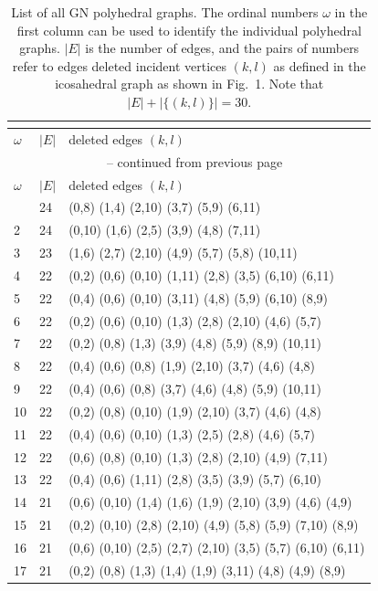 \footnotesize{\begin{longtable}{lll}
    \caption{List of all GN polyhedral graphs. The ordinal numbers $\omega$ in the first column
    can be used to identify the individual polyhedral graphs.
    $|E|$ is the number of edges, and the pairs of numbers refer to edges deleted
    incident vertices $(k,l)$ as defined in the icosahedral graph
    as shown in Fig.~1. Note that $|E|+|\{(k,l)\}|=30.$}\\
    \label{tab:icosubgraphs}\\
%
\toprule
    $\omega$  & $|E|$  &  deleted edges $(k,l)$\\\midrule
\endfirsthead
\multicolumn{3}{c}{\tablename~\thetable{} -- continued from previous page}\\
\toprule
    $\omega$  & $|E|$  &  deleted edges $(k,l)$\\\midrule
\endhead
\bottomrule\endfoot
1   & 24 & (0,8) (1,4) (2,10) (3,7) (5,9) (6,11) \\
2   & 24 & (0,10) (1,6) (2,5) (3,9) (4,8) (7,11) \\
3   & 23 & (1,6) (2,7) (2,10) (4,9) (5,7) (5,8) (10,11) \\
4   & 22 & (0,2) (0,6) (0,10) (1,11) (2,8) (3,5) (6,10) (6,11) \\
5   & 22 & (0,4) (0,6) (0,10) (3,11) (4,8) (5,9) (6,10) (8,9) \\
6   & 22 & (0,2) (0,6) (0,10) (1,3) (2,8) (2,10) (4,6) (5,7) \\
7   & 22 & (0,2) (0,8) (1,3) (3,9) (4,8) (5,9) (8,9) (10,11) \\
8   & 22 & (0,4) (0,6) (0,8) (1,9) (2,10) (3,7) (4,6) (4,8) \\
9   & 22 & (0,4) (0,6) (0,8) (3,7) (4,6) (4,8) (5,9) (10,11) \\
10  & 22 & (0,2) (0,8) (0,10) (1,9) (2,10) (3,7) (4,6) (4,8) \\
11  & 22 & (0,4) (0,6) (0,10) (1,3) (2,5) (2,8) (4,6) (5,7) \\
12  & 22 & (0,6) (0,8) (0,10) (1,3) (2,8) (2,10) (4,9) (7,11) \\
13  & 22 & (0,4) (0,6) (1,11) (2,8) (3,5) (3,9) (5,7) (6,10) \\
14  & 21 & (0,6) (0,10) (1,4) (1,6) (1,9) (2,10) (3,9) (4,6) (4,9) \\
15  & 21 & (0,2) (0,10) (2,8) (2,10) (4,9) (5,8) (5,9) (7,10) (8,9) \\
16  & 21 & (0,6) (0,10) (2,5) (2,7) (2,10) (3,5) (5,7) (6,10) (6,11) \\
17  & 21 & (0,2) (0,8) (1,3) (1,4) (1,9) (3,11) (4,8) (4,9) (8,9) \\

\end{longtable}}
